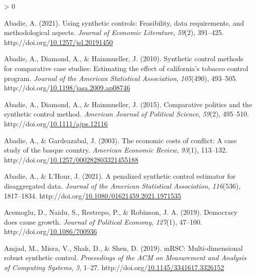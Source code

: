 \documentclass[12pt,nobind, a4paper]{reedthesis}
\newlength{\cslhangindent}
\newenvironment{CSLReferences}[2] %
{%
	\setlength{\parindent}{0pt}
	\ifodd #1 \everypar{\setlength{\hangindent}{\cslhangindent}}\ignorespaces\fi
	\ifnum #2 > 0
	\setlength{\parskip}{#2\baselineskip}
	\fi
}%
{}
\begin{document}
 \hypertarget{refs}{}
 \begin{CSLReferences}{1}{0}
 \leavevmode\hypertarget{ref-abadie_using_2021}{}%
 Abadie, A. (2021). Using synthetic controls: Feasibility, data requirements, and methodological aspects. \emph{Journal of Economic Literature}, \emph{59}(2), 391--425. http://doi.org/\href{https://doi.org/10.1257/jel.20191450}{10.1257/jel.20191450}

 \leavevmode\hypertarget{ref-abadie_synthetic_2010}{}%
 Abadie, A., Diamond, A., \& Hainmueller, J. (2010). Synthetic control methods for comparative case studies: Estimating the effect of california's tobacco control program. \emph{Journal of the American Statistical Association}, \emph{105}(490), 493--505. http://doi.org/\href{https://doi.org/10.1198/jasa.2009.ap08746}{10.1198/jasa.2009.ap08746}

 \leavevmode\hypertarget{ref-abadie_comparative_2015}{}%
 Abadie, A., Diamond, A., \& Hainmueller, J. (2015). Comparative politics and the synthetic control method. \emph{American Journal of Political Science}, \emph{59}(2), 495--510. http://doi.org/\href{https://doi.org/10.1111/ajps.12116}{10.1111/ajps.12116}

 \leavevmode\hypertarget{ref-abadie_economic_2003}{}%
 Abadie, A., \& Gardeazabal, J. (2003). The economic costs of conflict: A case study of the basque country. \emph{American Economic Review}, \emph{93}(1), 113--132. http://doi.org/\href{https://doi.org/10.1257/000282803321455188}{10.1257/000282803321455188}

 \leavevmode\hypertarget{ref-abadie_penalized_2021}{}%
 Abadie, A., \& L'Hour, J. (2021). A penalized synthetic control estimator for disaggregated data. \emph{Journal of the American Statistical Association}, \emph{116}(536), 1817--1834. http://doi.org/\href{https://doi.org/10.1080/01621459.2021.1971535}{10.1080/01621459.2021.1971535}

 \leavevmode\hypertarget{ref-acemoglu_democracy_2019}{}%
 Acemoglu, D., Naidu, S., Restrepo, P., \& Robinson, J. A. (2019). Democracy does cause growth. \emph{Journal of Political Economy}, \emph{127}(1), 47--100. http://doi.org/\href{https://doi.org/10.1086/700936}{10.1086/700936}

 \leavevmode\hypertarget{ref-amjad_mrsc_2019}{}%
 Amjad, M., Misra, V., Shah, D., \& Shen, D. (2019). {mRSC}: Multi-dimensional robust synthetic control. \emph{Proceedings of the {ACM} on Measurement and Analysis of Computing Systems}, \emph{3}, 1--27. http://doi.org/\href{https://doi.org/10.1145/3341617.3326152}{10.1145/3341617.3326152}


\end{CSLReferences}
\end{document}
